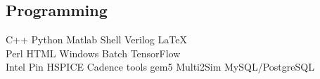 \documentclass[]{resume}
\begin{document}
\begin{minipage}[t]{0.377\textwidth}
\subsection{Programming}
C++ \textbullet{} Python \textbullet{} Matlab \textbullet{} Shell \textbullet{}
Verilog \textbullet{} \LaTeX%
\\
Perl \textbullet{} HTML \textbullet{} Windows Batch
\textbullet{} TensorFlow \\ %
Intel Pin \textbullet{} HSPICE \textbullet{} Cadence tools \textbullet{}
gem5 \textbullet{} Multi2Sim \textbullet{} MySQL/PostgreSQL
\sectionsep%

%
%

\end{minipage}
\hfill
\end{document}
